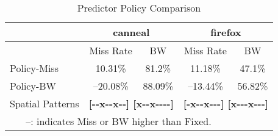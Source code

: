 \begin{table}[!htb]
  \centering
  \begin{tabular}{|l|c|c|c|c| }
    \hline
    & \multicolumn{2}{c|}{canneal} &  \multicolumn{2}{c|}{firefox} \\
    \hline
    & Miss Rate & BW & Miss Rate & BW\\
    \hline
    Policy-Miss & 10.31\% & 81.2\% & 11.18\% & 47.1\%\\
    \hline
    Policy-BW & --20.08\% & 88.09\% & --13.44\% & 56.82\%\\
    \hline
    Spatial Patterns & \multicolumn{2}{c|}{\textbf{[{-}{-}x{-}{-}x{-}{-}]
        [x{-}{-}x{-}{-}{-}{-}]}} &
    \multicolumn{2}{c|}{\textbf{[{-}x{-}{-}x{-}{-}{-}]
        [x{-}{-}{-}x{-}{-}{-}]}} \\
    \hline
    \multicolumn{4}{c}{--: indicates Miss or BW higher than Fixed.}
  \end{tabular}
  \caption{Predictor Policy Comparison}
  \label{table:predictor_policy}
\end{table}